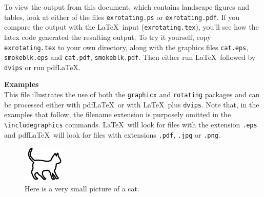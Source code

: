\documentclass[11pt]{article}
\begin{document}
To view the output from this document, which contains landscape figures 
and tables, look at either of the files \texttt{exrotating.ps} or 
\texttt{exrotating.pdf}. If you compare the output with the \LaTeX\ input 
(\texttt{exrotating.tex}), you'll see how the latex code generated
the resulting output. To try it yourself, copy \texttt{exrotating.tex} 
to your own directory, along with the graphics files \texttt{cat.eps}, 
\texttt{smokeblk.eps} and \texttt{cat.pdf}, \texttt{smokeblk.pdf}. 
Then either run \LaTeX\ followed by \texttt{dvips} or run pdf\LaTeX. 

\textbf{\large Examples} \\[2pt]
This file illustrates the use of both the \texttt{graphicx} and
\texttt{rotating} packages and can be processed either with pdf\LaTeX\ or
with \LaTeX\ plus \texttt{dvips}.  Note that, in the examples that follow,
the filename extension is purposely omitted in the 
\verb+\includegraphics+ commands. \LaTeX\ will look for files with the 
extension \texttt{.eps} and pdf\LaTeX\ will look for files with extensions 
\texttt{.pdf}, \texttt{.jpg} or \texttt{.png}. 
 
\begin{figure}[b]   %
\centering          %
\includegraphics{cat}
\caption{Here is a very small picture of a cat.}
\end{figure}
\end{document}
